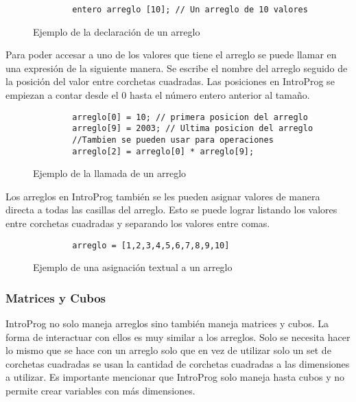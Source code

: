 \begin{figure}[!htbp]
    \centering
    
    \begin{lstlisting}
        entero arreglo [10]; // Un arreglo de 10 valores

    \end{lstlisting}
    \caption{Ejemplo de la declaración de un arreglo}
\end{figure}
\FloatBarrier


Para poder accesar a uno de los valores que tiene el arreglo se puede llamar en una expresión de la siguiente manera. Se escribe el nombre del arreglo seguido de la posición del valor entre corchetas cuadradas. Las posiciones en IntroProg se empiezan a contar desde el 0 hasta el número entero anterior al tamaño.\\

\begin{figure}[!htbp]
    \centering
    
    \begin{lstlisting}
        arreglo[0] = 10; // primera posicion del arreglo
        arreglo[9] = 2003; // Ultima posicion del arreglo
        //Tambien se pueden usar para operaciones
        arreglo[2] = arreglo[0] * arreglo[9];

    \end{lstlisting}
    \caption{Ejemplo de la llamada de un arreglo}
\end{figure}
\FloatBarrier
Los arreglos en IntroProg también se les pueden asignar valores de manera directa a todas las casillas del arreglo. Esto se puede lograr listando los valores entre corchetas cuadradas y separando los valores entre comas.

\begin{figure}[!htbp]
    \centering
    
    \begin{lstlisting}
        arreglo = [1,2,3,4,5,6,7,8,9,10]

    \end{lstlisting}
    \caption{Ejemplo de una asignación textual a un arreglo}
\end{figure}
\FloatBarrier
\subsubsection{Matrices y Cubos}
IntroProg no solo maneja arreglos sino también maneja matrices y cubos. La forma de interactuar con ellos es muy similar a los arreglos. Solo se necesita hacer lo mismo que se hace con un arreglo solo que en vez de utilizar solo un set de corchetas cuadradas se usan la cantidad de corchetas cuadradas a las dimensiones a utilizar. Es importante mencionar que IntroProg solo maneja hasta cubos y no permite crear variables con más dimensiones.


